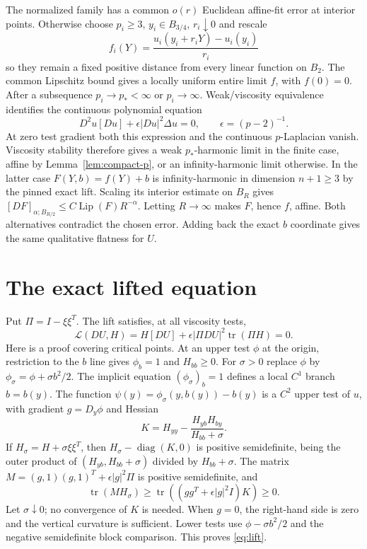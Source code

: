 \documentclass[11pt]{article}
\theoremstyle{remark}\newtheorem{remark}[theorem]{Remark}
\newcommand{\tr}{\operatorname{tr}}
\begin{document}
The normalized family has a common $o(r)$ Euclidean affine-fit error
at interior points. Otherwise choose $p_i\geq3$, $y_i\in B_{3/4}$,
$r_i\downarrow0$ and rescale
\[
 f_i(Y)=\frac{u_i(y_i+r_iY)-u_i(y_i)}{r_i}
\]
so they remain a fixed positive distance from every linear function
on $B_2$. The common Lipschitz bound gives a locally uniform entire
limit $f$, with $f(0)=0$. After a subsequence $p_i\to p_*<\infty$
or $p_i\to\infty$. Weak/viscosity equivalence identifies the
continuous polynomial equation
\begin{equation}\label{eq:p-poly}
 D^2u[Du]+\epsilon |Du|^2\Delta u=0,
 \qquad\epsilon=(p-2)^{-1}.
\end{equation}
At zero test gradient both this expression and the continuous
$p$-Laplacian vanish. Viscosity stability therefore gives a weak
$p_*$-harmonic limit in the finite case, affine by
Lemma~\ref{lem:compact-p}, or an infinity-harmonic limit otherwise.
In the latter case $F(Y,b)=f(Y)+b$ is infinity-harmonic in dimension
$n+1\geq3$ by the pinned exact lift. Scaling its interior estimate
on $B_R$ gives $[DF]_{\alpha;B_{R/2}}\leq C\operatorname{Lip}(F)R^{-\alpha}$.
Letting $R\to\infty$ makes $F$, hence $f$, affine. Both alternatives
contradict the chosen error. Adding back the exact $b$ coordinate
gives the same qualitative flatness for $U$.

\section{The exact lifted equation}

Put $\Pi=I-\xi\xi^T$. The lift satisfies, at all viscosity tests,
\begin{equation}\label{eq:lift}
 \mathcal L(DU,H)=H[DU]+\epsilon|\Pi DU|^2\tr(\Pi H)=0.
\end{equation}
Here is a proof covering critical points. At an upper test $\phi$
at the origin, restriction to the $b$ line gives $\phi_b=1$ and
$H_{bb}\geq0$. For $\sigma>0$ replace $\phi$ by
$\phi_\sigma=\phi+\sigma b^2/2$. The implicit equation
$(\phi_\sigma)_b=1$ defines a local $C^1$ branch $b=b(y)$.
The function $\psi(y)=\phi_\sigma(y,b(y))-b(y)$ is a $C^2$ upper
test of $u$, with gradient $g=D_y\phi$ and Hessian
\[
 K=H_{yy}-\frac{H_{yb}H_{by}}{H_{bb}+\sigma}.
\]
If $H_\sigma=H+\sigma\xi\xi^T$, then
$H_\sigma-\operatorname{diag}(K,0)$ is positive semidefinite, being
the outer product of $(H_{yb},H_{bb}+\sigma)$ divided by
$H_{bb}+\sigma$. The matrix
$M=(g,1)(g,1)^T+\epsilon|g|^2\Pi$ is positive semidefinite, and
\[
 \tr(MH_\sigma)\geq\tr((gg^T+\epsilon|g|^2I)K)\geq0.
\]
Let $\sigma\downarrow0$; no convergence of $K$ is needed. When
$g=0$, the right-hand side is zero and the vertical curvature is
sufficient. Lower tests use $\phi-\sigma b^2/2$ and the negative
semidefinite block comparison. This proves \eqref{eq:lift}.
\end{document}
